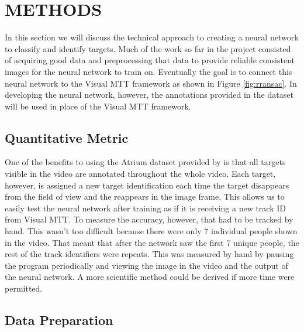 \documentclass[letterpaper, 10 pt, conference]{ieeeconf}  %
\begin{document}
\section{METHODS} \label{METHODS}

In this section we will discuss the technical approach to creating a neural network to classify and identify targets. Much of the work so far in the project consisted of acquiring good data and preprocessing that data to provide reliable consistent images for the neural network to train on. Eventually the goal is to connect this neural network to the Visual MTT framework as shown in Figure \ref{fig:rransac}. In developing the neural network, however, the annotations provided in the dataset will be used in place of the Visual MTT framework.

\subsection{Quantitative Metric}

One of the benefits to using the Atrium dataset provided by \cite{jodoin2014urban} is that all targets visible in the video are annotated throughout the whole video. Each target, however, is assigned a new target identification each time the target disappears from the field of view and the reappears in the image frame. This allows us to easily test the neural network after training as if it is receiving a new track ID from Visual MTT. To measure the accuracy, however, that had to be tracked by hand. This wasn't too difficult because there were only 7 individual people shown in the video. That meant that after the network saw the first 7 unique people, the rest of the track identifiers were repeats. This was measured by hand by pausing the program periodically and viewing the image in the video and the output of the neural network. A more scientific method could be derived if more time were permitted.

\subsection{Data Preparation} 
\end{document}
